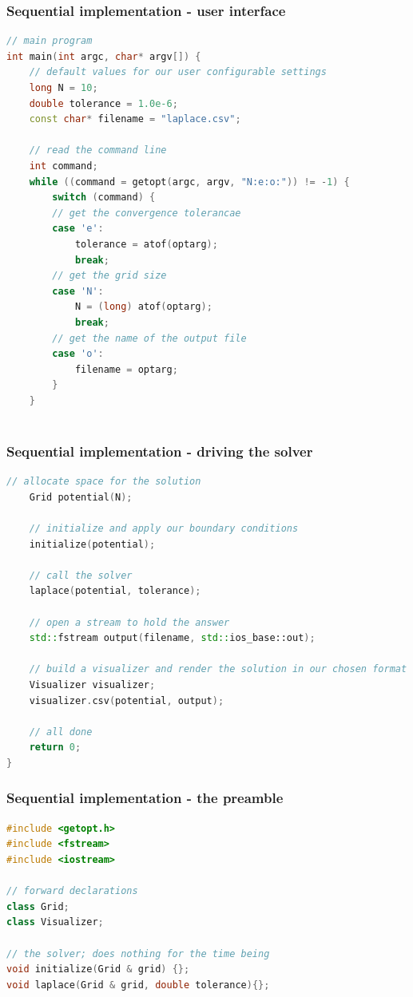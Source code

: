 \begin{frame}[fragile]
%
  \frametitle{Sequential implementation - user interface}
%
  \begin{lstlisting}[language=c++,name=seq:frame,firstnumber=77]
// main program
int main(int argc, char* argv[]) {
    // default values for our user configurable settings
    long N = 10;
    double tolerance = 1.0e-6;
    const char* filename = "laplace.csv";

    // read the command line
    int command;
    while ((command = getopt(argc, argv, "N:e:o:")) != -1) {
        switch (command) {
        // get the convergence tolerancae
        case 'e':
            tolerance = atof(optarg);
            break;
        // get the grid size
        case 'N':
            N = (long) atof(optarg);
            break;
        // get the name of the output file
        case 'o':
            filename = optarg;
        }
    }
    
  \end{lstlisting}
% 
\end{frame}

\begin{frame}[fragile]
%
  \frametitle{Sequential implementation - driving the solver}
%
  \begin{lstlisting}[language=c++,name=seq:frame]
    // allocate space for the solution
    Grid potential(N);

    // initialize and apply our boundary conditions
    initialize(potential);

    // call the solver
    laplace(potential, tolerance);

    // open a stream to hold the answer
    std::fstream output(filename, std::ios_base::out);

    // build a visualizer and render the solution in our chosen format
    Visualizer visualizer;
    visualizer.csv(potential, output);

    // all done
    return 0;
}
  \end{lstlisting}
% 
\end{frame}

\begin{frame}[fragile]
%
  \frametitle{Sequential implementation - the preamble}
%
  \begin{lstlisting}[language=c++,name=seq:frame, firstnumber=1]
#include <getopt.h>
#include <fstream>
#include <iostream>

// forward declarations
class Grid;
class Visualizer;

// the solver; does nothing for the time being
void initialize(Grid & grid) {};
void laplace(Grid & grid, double tolerance){};

  \end{lstlisting}
% 
\end{frame}

